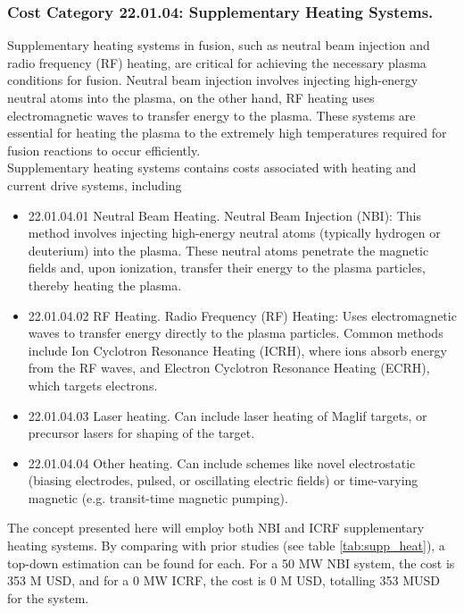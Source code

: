 \subsubsection*{Cost Category 22.01.04: Supplementary Heating Systems.}

Supplementary heating systems in fusion, such as neutral beam injection and radio frequency (RF) heating, are critical for achieving the necessary plasma conditions for fusion. Neutral beam injection involves injecting high-energy neutral atoms into the plasma, on the other hand, RF heating uses electromagnetic waves to transfer energy to the plasma. These systems are essential for heating the plasma to the extremely high temperatures required for fusion reactions to occur efficiently.\\

Supplementary heating systems contains costs associated with heating and current drive systems, including 

\begin{itemize}
    \item 22.01.04.01 Neutral Beam Heating.   Neutral Beam Injection (NBI): This method involves injecting high-energy neutral atoms (typically hydrogen or deuterium) into the plasma. These neutral atoms penetrate the magnetic fields and, upon ionization, transfer their energy to the plasma particles, thereby heating the plasma.
    \item 22.01.04.02 RF Heating.  Radio Frequency (RF) Heating: Uses electromagnetic waves to transfer energy directly to the plasma particles. Common methods include Ion Cyclotron Resonance Heating (ICRH), where ions absorb energy from the RF waves, and Electron Cyclotron Resonance Heating (ECRH), which targets electrons.
    \item 22.01.04.03 Laser heating.  Can include laser heating of Maglif targets, or precursor lasers for shaping of the target.
    \item 22.01.04.04 Other heating.  Can include schemes like novel electrostatic (biasing electrodes, pulsed, or oscillating electric fields) or time-varying magnetic (e.g. transit-time magnetic pumping).
\end{itemize}


The concept presented here will employ both NBI and ICRF supplementary heating systems. By comparing with prior studies (see table \ref{tab:supp_heat}), a top-down estimation can be found for each. For a 50 MW NBI system, the cost is 353 M USD, and for a 0 MW ICRF, the cost is 0 M USD, totalling 353 MUSD for the system.


